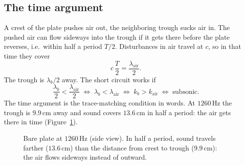 \subsection{The time argument}
A crest of the plate pushes air out, the neighboring trough sucks air in. The
pushed air can flow sideways into the trough if it gets there before the plate
reverses, i.e.\ within half a period $T/2$. Disturbances in air travel at $c$, so
in that time they cover
\begin{equation}
  c\,\frac{T}{2} = \frac{\lambda_\mathrm{air}}{2} .
\end{equation}
The trough is $\lambda_b/2$ away. The short circuit works if
\begin{equation}
  \frac{\lambda_b}{2} < \frac{\lambda_\mathrm{air}}{2}
  \;\Longleftrightarrow\; \lambda_b < \lambda_\mathrm{air}
  \;\Longleftrightarrow\; k_b > k_\mathrm{air}
  \;\Longleftrightarrow\; \text{subsonic} .
\end{equation}
The time argument is the trace-matching condition in words. At $1260\,\mathrm{Hz}$
the trough is $9.9\,\mathrm{cm}$ away and sound covers $13.6\,\mathrm{cm}$ in half a
period: the air gets there in time (Figure~\ref{fig:short_circuit}).

\begin{figure}[htbp]
\centering
{}
\caption{Bare plate at $1260\,\mathrm{Hz}$ (side view). In half a period, sound
travels farther ($13.6\,\mathrm{cm}$) than the distance from crest to trough
($9.9\,\mathrm{cm}$): the air flows sideways instead of outward.}
\label{fig:short_circuit}
\end{figure}

